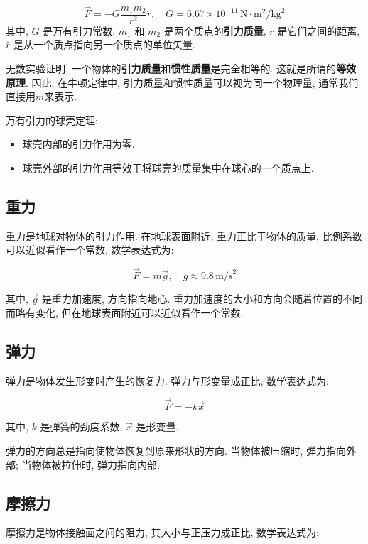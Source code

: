 \documentclass[
  a4paper,
]{ctexrep}
\providecommand{\tightlist}{%
  \setlength{\itemsep}{0pt}\setlength{\parskip}{0pt}}
\begin{document}
\[\vec{F} = -G \frac{m_1 m_2}{r^2} \hat{r}, \quad G = 6.67 \times 10^{-11} \, \text{N}\cdot\text{m}^2/\text{kg}^2\]
其中, \(G\) 是万有引力常数, \(m_1\) 和 \(m_2\)
是两个质点的\textbf{引力质量}, \(r\) 是它们之间的距离, \(\hat{r}\)
是从一个质点指向另一个质点的单位矢量.

无数实验证明,
一个物体的\textbf{引力质量}和\textbf{惯性质量}是完全相等的.
这就是所谓的\textbf{等效原理}. 因此, 在牛顿定律中,
引力质量和惯性质量可以视为同一个物理量, 通常我们直接用\(m\)来表示.

万有引力的球壳定理:

\begin{itemize}
\tightlist
\item
  球壳内部的引力作用为零.
\item
  球壳外部的引力作用等效于将球壳的质量集中在球心的一个质点上.
\end{itemize}

\subsection{重力}\label{ux91cdux529b}

重力是地球对物体的引力作用. 在地球表面附近, 重力正比于物体的质量,
比例系数可以近似看作一个常数, 数学表达式为:

\[\vec{F} = m \vec{g}, \quad g \approx 9.8 \, \text{m/s}^2\]

其中, \(\vec{g}\) 是重力加速度, 方向指向地心.
重力加速度的大小和方向会随着位置的不同而略有变化,
但在地球表面附近可以近似看作一个常数.

\subsection{弹力}\label{ux5f39ux529b}

弹力是物体发生形变时产生的恢复力. 弹力与形变量成正比, 数学表达式为:

\[\vec{F} = -k \vec{x}\]

其中, \(k\) 是弹簧的劲度系数, \(\vec{x}\) 是形变量.

弹力的方向总是指向使物体恢复到原来形状的方向. 当物体被压缩时,
弹力指向外部; 当物体被拉伸时, 弹力指向内部.

\subsection{摩擦力}\label{ux6469ux64e6ux529b}

摩擦力是物体接触面之间的阻力, 其大小与正压力成正比, 数学表达式为:
\end{document}
